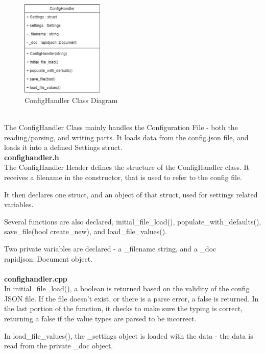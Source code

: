 \documentclass[conference]{IEEEtran}
\begin{document}
\begin{figure}[h]
    \centering
    \includegraphics[width=0.35\textwidth]{images/code_diagrams/confighandler_uml.eps}
    \caption{ConfigHandler Class Diagram}
\end{figure}~\\

The ConfigHandler Class mainly handles the Configuration File - both the reading/parsing, and writing parts. It loads data from the config.json file, and loads it into a defined Settings struct.\\


\textbf{confighandler.h}~\\

The ConfigHandler Header defines the structure of the ConfigHandler class. It receives a filename in the constructor, that is used to refer to the config file.

It then declares one struct, and an object of that struct, used for settings related variables.

Several functions are also declared, initial\_file\_load(), populate\_with\_defaults(), save\_file(bool create\_new), and load\_file\_values().

Two private variables are declared - a \_filename string, and a \_doc rapidjson::Document object.~\\~\\


\textbf{confighandler.cpp}~\\

In initial\_file\_load(), a boolean is returned based on the validity of the config JSON file. If the file doesn't exist, or there is a parse error, a false is returned. In the last portion of the function, it checks to make sure the typing is correct, returning a false if the value types are parsed to be incorrect.

In load\_file\_values(), the \_settings object is loaded with the data - the data is read from the private \_doc object.
\end{document}
